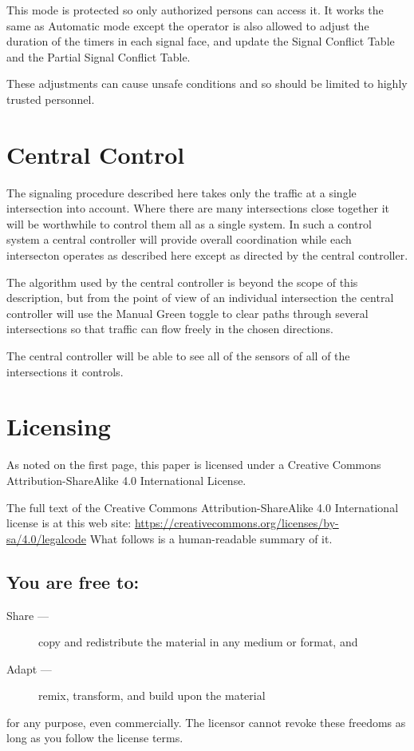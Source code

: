 \documentclass[letterpaper,twoside]{article}
\begin{document}
This mode is protected so only authorized persons can access it.
It works the same as Automatic mode except the operator is also allowed to
adjust the duration of the timers in each signal face, and update the
Signal Conflict Table and the Partial Signal Conflict Table.

These adjustments can cause unsafe conditions and so should be limited
to highly trusted personnel.

\section{Central Control}

The signaling procedure described here takes only the traffic at a single
intersection into account.  Where there are many intersections close
together it will be worthwhile to control them all as a single system.
In such a control system a central controller will provide overall
coordination while each intersecton operates as described here except as
directed by the central controller.

The algorithm used by the central controller is beyond the scope of this
description, but from the point of view of an individual intersection
the central controller will use the Manual Green toggle to clear paths
through several intersections so that traffic can flow freely in the
chosen directions.

The central controller will be able to see all of the sensors of all
of the intersections it controls.

\section{Licensing}
\label{section:Licensing}
As noted on the first page, this paper is licensed under a Creative
Commons Attribution-ShareAlike 4.0 International License.

The full text of the Creative Commons Attribution-ShareAlike 4.0
International license is at this web site:
\href{https://creativecommons.org/licenses/by-sa/4.0/legalcode}{https://creativecommons.org/licenses/by-sa/4.0/legalcode}%
What follows is a human-readable summary of it.

\subsection{You are free to:}
\begin{description}
\item[Share ---]copy and redistribute the material in any medium or format, and
\item[Adapt ---]remix, transform, and build upon the material
\end{description}
for any purpose, even commercially.  The licensor cannot revoke these
freedoms as long as you follow the license terms.
\end{document}
